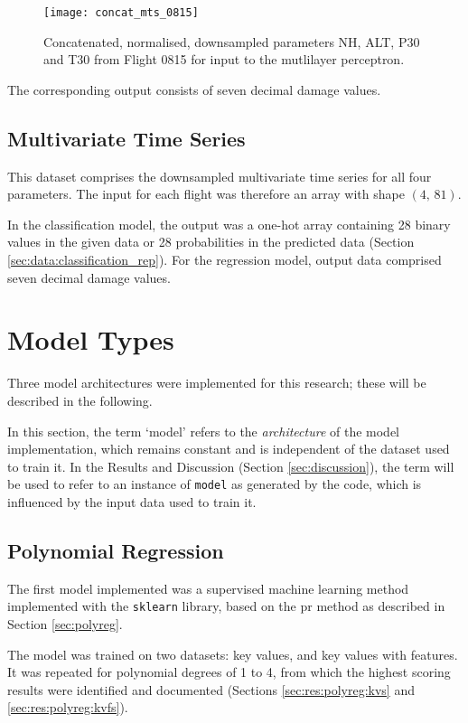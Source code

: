 \begin{figure}[tb!]
    \centering
    \texttt{[image: concat\_mts\_0815]}
    \caption{\label{fig:concat_mts_0815} Concatenated, normalised, downsampled parameters NH, ALT, P30 and T30 from Flight 0815 for input to the mutlilayer perceptron.}
\end{figure}

The corresponding output consists of seven decimal damage values.

\subsection{Multivariate Time Series} \label{sec:prac:dataset:mts}
This dataset comprises the downsampled multivariate time series for all four parameters. The input for each flight was therefore an array with shape \(\left(4,\,81\right)\).

In the classification model, the output was a one-hot array containing 28 binary values in the given data or 28 probabilities in the predicted data (Section \ref{sec:data:classification_rep}). For the regression model, output data comprised seven decimal damage values.

\section{Model Types}
Three model architectures were implemented for this research; these will be described in the following.

In this section, the term `model' refers to the \textit{architecture} of the model implementation, which remains constant and is independent of the dataset used to train it. In the Results and Discussion (Section \ref{sec:discussion}), the term will be used to refer to an instance of \texttt{model} as generated by the code, which is influenced by the input data used to train it.

\subsection{Polynomial Regression} \label{sec:res:polyreg}
The first model implemented was a supervised machine learning method implemented with the \texttt{sklearn} library, based on the \ac{pr} method as described in Section \ref{sec:polyreg}.

The model was trained on two datasets: key values, and key values with features. It was repeated for polynomial degrees of 1 to 4, from which the highest scoring results were identified and documented (Sections \ref{sec:res:polyreg:kvs} and \ref{sec:res:polyreg:kvfs}).

